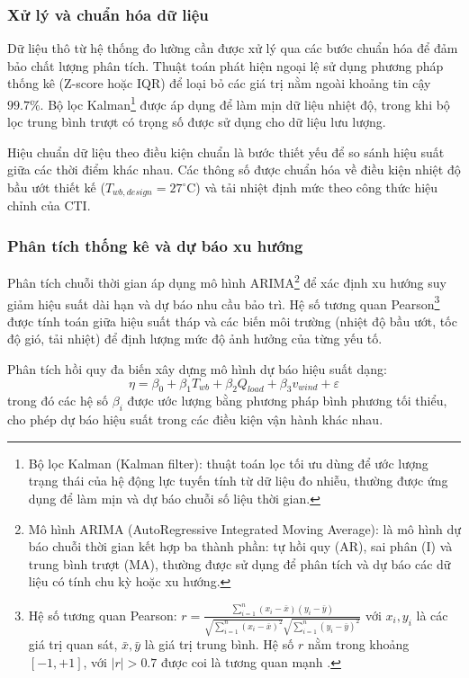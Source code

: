 \documentclass[../main.tex]{subfiles}
\begin{document}
\subsubsection{Xử lý và chuẩn hóa dữ liệu}
Dữ liệu thô từ hệ thống đo lường cần được xử lý qua các bước chuẩn hóa để đảm bảo chất lượng phân tích. Thuật toán phát hiện ngoại lệ sử dụng phương pháp thống kê (Z-score hoặc IQR) \cite{zscore_iqr_stat} để loại bỏ các giá trị nằm ngoài khoảng tin cậy $99.7\%$. Bộ lọc Kalman\footnote{Bộ lọc Kalman (Kalman filter): thuật toán lọc tối ưu dùng để ước lượng trạng thái của hệ động lực tuyến tính từ dữ liệu đo nhiễu, thường được ứng dụng để làm mịn và dự báo chuỗi số liệu thời gian.} được áp dụng để làm mịn dữ liệu nhiệt độ, trong khi bộ lọc trung bình trượt có trọng số được sử dụng cho dữ liệu lưu lượng.

Hiệu chuẩn dữ liệu theo điều kiện chuẩn là bước thiết yếu để so sánh hiệu suất giữa các thời điểm khác nhau. Các thông số được chuẩn hóa về điều kiện nhiệt độ bầu ướt thiết kế ($T_{wb,design} = 27^\circ\mathrm{C}$) và tải nhiệt định mức theo công thức hiệu chỉnh của CTI.

\subsubsection{Phân tích thống kê và dự báo xu hướng}
Phân tích chuỗi thời gian áp dụng mô hình ARIMA\footnote{Mô hình ARIMA (AutoRegressive Integrated Moving Average): là mô hình dự báo chuỗi thời gian kết hợp ba thành phần: tự hồi quy (AR), sai phân (I) và trung bình trượt (MA), thường được sử dụng để phân tích và dự báo các dữ liệu có tính chu kỳ hoặc xu hướng.} \cite{box_jenkins_arima} để xác định xu hướng suy giảm hiệu suất dài hạn và dự báo nhu cầu bảo trì. Hệ số tương quan Pearson\footnote{Hệ số tương quan Pearson: $r = \frac{\sum_{i=1}^{n}(x_i - \bar{x})(y_i - \bar{y})}{\sqrt{\sum_{i=1}^{n}(x_i - \bar{x})^2}\sqrt{\sum_{i=1}^{n}(y_i - \bar{y})^2}}$ với $x_i, y_i$ là các giá trị quan sát, $\bar{x}, \bar{y}$ là giá trị trung bình. Hệ số $r$ nằm trong khoảng $[-1, +1]$, với $|r| > 0.7$ được coi là tương quan mạnh \cite{stull2011meteorology}.} được tính toán giữa hiệu suất tháp và các biến môi trường (nhiệt độ bầu ướt, tốc độ gió, tải nhiệt) để định lượng mức độ ảnh hưởng của từng yếu tố.

Phân tích hồi quy đa biến xây dựng mô hình dự báo hiệu suất dạng:
\begin{equation}
    \eta = \beta_0 + \beta_1 T_{wb} + \beta_2 Q_{load} + \beta_3 v_{wind} + \varepsilon
\end{equation}
trong đó các hệ số $\beta_i$ được ước lượng bằng phương pháp bình phương tối thiểu, cho phép dự báo hiệu suất trong các điều kiện vận hành khác nhau.
\end{document}
